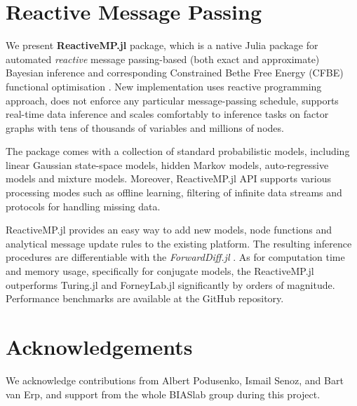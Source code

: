 \documentclass{juliacon}
\begin{document}
\section{Reactive Message Passing}

We present \textbf{ReactiveMP.jl} package, which is a native Julia \cite{bezanson2017julia} package for automated \textit{reactive} message passing-based (both exact and approximate) Bayesian inference and corresponding
Constrained Bethe Free Energy (CFBE) functional optimisation \cite{senoz_local_constraint_2021}. New implementation uses reactive programming approach, does not enforce any particular message-passing schedule, 
supports real-time data inference and scales comfortably to inference tasks on factor graphs with tens of thousands of variables and millions of nodes.

The package comes with a collection of standard probabilistic models, including linear Gaussian state-space models, hidden Markov models, auto-regressive models and mixture models. 
Moreover, ReactiveMP.jl API supports various processing modes such as offline learning, filtering of infinite data streams and protocols for handling missing data.

ReactiveMP.jl provides an easy way to add new models, node functions and analytical message update rules to the existing platform. 
The resulting inference procedures are differentiable with the \textit{ForwardDiff.jl} \cite{RevelsLubinPapamarkou2016}. As for computation time and memory usage, specifically for conjugate models, 
the ReactiveMP.jl outperforms Turing.jl and ForneyLab.jl significantly by orders of magnitude. Performance benchmarks are available at the GitHub repository.

\section{Acknowledgements}

We acknowledge contributions from Albert Podusenko, Ismail Senoz, and Bart van Erp, and support from the whole BIASlab group during this project.


\end{document}
